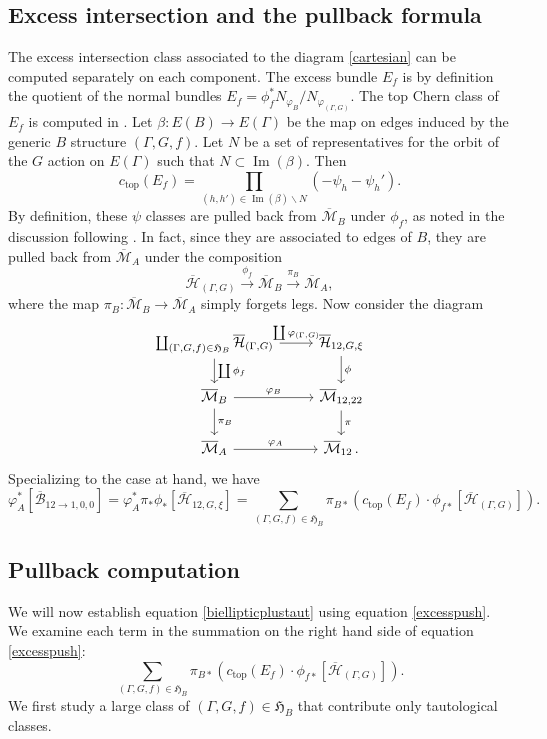 \documentclass[12pt]{amsart}
\theoremstyle{definition}
\newcommand{\Bb}{\overline{\mathcal{B}}}
\newcommand{\Hb}{\overline{\mathcal{H}}}
\newcommand{\M}{\mathcal{M}}
\DeclareMathOperator{\im}{Im}
\newcommand{\Mb}{\overline{\M}}
\begin{document}
\subsection{Excess intersection and the pullback formula}
The excess intersection class associated to the diagram \eqref{cartesian} can be computed separately on each component. The excess bundle $E_f$ is by definition the quotient of the normal bundles $E_f=\phi_f^*N_{\varphi_B}/N_{\varphi_{(\Gamma,G)}}$. The top Chern class of $E_f$ is computed in \cite[Proposition 4.7]{SvZ}. Let $\beta:E(B)\rightarrow E(\Gamma)$ be the map on edges induced by the generic $B$ structure $(\Gamma,G,f)$. Let $N$ be a set of representatives for the orbit of the $G$ action on $E(\Gamma)$ such that $N\subset \im(\beta)$. Then 
\[
c_{\mathrm{top}}(E_f)=\prod_{(h,h')\in \im(\beta)\smallsetminus N} (-\psi_h-\psi_h').
\]
By definition, these $\psi$ classes are pulled back from $\Mb_{B}$ under $\phi_f$, as noted in the discussion following \cite[Theorem 4.9]{SvZ}. In fact, since they are associated to edges of $B$, they are pulled back from $\Mb_{A}$ under the composition
\[
\Hb_{(\Gamma,G)}\xrightarrow{\phi_f} \Mb_{B}\xrightarrow{\pi_B} \Mb_{A},
\]
where the map $\pi_{B}:\Mb_{B}\rightarrow \Mb_{A}$ simply forgets legs. Now consider the diagram
\[
\begin{tikzcd}
{ \coprod_{(\Gamma,G,f)\in \mathfrak{H}_B} \Hb_{(\Gamma,G)}} \arrow[d, "\coprod\phi_f"] \arrow[r, "{\coprod\varphi_{(\Gamma,G)}}"] & {\Hb_{12,G,\xi}} \arrow[d, "\phi"] \\
\Mb_{B} \arrow[d, "\pi_B"] \arrow[r, "\varphi_B"]                                                                             & {\Mb_{12,22}} \arrow[d, "\pi"]     \\
\Mb_{A} \arrow[r, "\varphi_{A}"]                                                                                      & \Mb_{12}\,.                          
\end{tikzcd}
\]
Specializing \cite[Theorem 4.12]{SvZ} to the case at hand, we have 
\begin{equation}\label{excesspush} 
\varphi_{A}^*[\Bb_{12\rightarrow 1,0,0}]=\varphi_A^*\pi_*\phi_*[\Hb_{12,G,\xi}]=\sum_{(\Gamma,G,f)\in \mathfrak{H}_B} \pi_{B*}\left(c_{\mathrm{top}}(E_f)\cdot \phi_{f*}[\Hb_{(\Gamma,G)}]\right).
\end{equation}

\subsection{Pullback computation}
We will now establish equation \eqref{biellipticplustaut} using equation \eqref{excesspush}.  We examine each term in the summation on the right hand side of equation \eqref{excesspush}:
    \[
    \sum_{(\Gamma,G,f)\in \mathfrak{H}_B} \pi_{B*}\left(c_{\mathrm{top}}(E_f)\cdot \phi_{f*}[\Hb_{(\Gamma,G)}]\right).
    \]
    We first study a large class of $(\Gamma,G,f)\in \mathfrak{H}_B$ that contribute only tautological classes.
\end{document}
